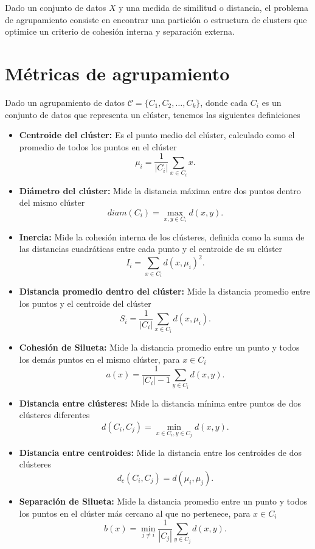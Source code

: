 \documentclass[a4,11pt]{aleph-notas}
\begin{document}
\begin{defi}
Dado un conjunto de datos \(X\) y una medida de similitud o distancia, el problema de agrupamiento consiste en encontrar una partición o estructura de clusters que optimice un criterio de cohesión interna y separación externa.
\end{defi}

\section{Métricas de agrupamiento}

Dado un agrupamiento de datos $\mathcal{C} = \{C_1, C_2, \ldots, C_k\}$, donde cada $C_i$ es un conjunto de datos que representa un clúster, tenemos las siguientes definiciones
\begin{itemize}
    \item \textbf{Centroide del clúster:} Es el punto medio del clúster, calculado como el promedio de todos los puntos en el clúster
    \[
    \mu_i = \frac{1}{|C_i|} \sum_{x \in C_i} x.
    \]
    \item \textbf{Diámetro del clúster:} Mide la distancia máxima entre dos puntos dentro del mismo clúster
    \[
    diam(C_i) = \max_{x,y \in C_i} d(x,y).
    \]
    \item \textbf{Inercia:} Mide la cohesión interna de los clústeres, definida como la suma de las distancias cuadráticas entre cada punto y el centroide de su clúster
    \[
    I_i = \sum_{x \in C_i} d(x, \mu_i)^2.
    \] 
    \item \textbf{Distancia promedio dentro del clúster:} Mide la distancia promedio entre los puntos y el centroide del clúster
    \[
    S_i = \frac{1}{|C_i|} \sum_{x \in C_i} d(x, \mu_i).
    \]
    \item \textbf{Cohesión de Silueta:} Mide la distancia promedio entre un punto y todos los demás puntos en el mismo clúster, para $x \in C_i$
    \[
        a(x) = \frac{1}{|C_i| - 1} \sum_{y \in C_i} d(x, y).
    \]
    \item \textbf{Distancia entre clústeres:} Mide la distancia mínima entre puntos de dos clústeres diferentes
    \[
    d(C_i, C_j) = \min_{x \in C_i, y \in C_j} d(x,y).
    \]
    \item \textbf{Distancia entre centroides:} Mide la distancia entre los centroides de dos clústeres
    \[
    d_c(C_i, C_j)= d(\mu_i, \mu_j).
    \]
    \item \textbf{Separación de Silueta:} Mide la distancia promedio entre un punto y todos los puntos en el clúster más cercano al que no pertenece, para $x\in C_i$
    \[
        b(x) = \min_{j \neq i} \frac{1}{|C_j|} \sum_{y\in C_j} d(x, y).
    \]
\end{itemize}
\end{document}
